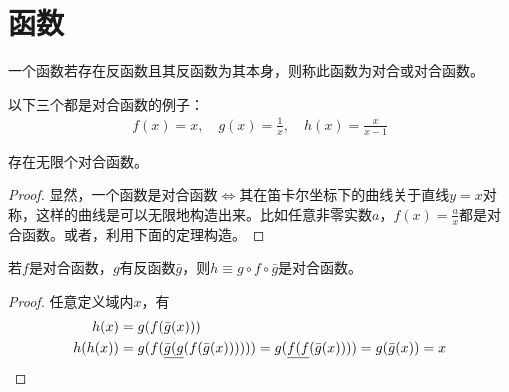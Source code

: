 
\section{函数}
\label{sec:function}

\begin{definition}[对合，Involution]
  一个函数若存在反函数且其反函数为其本身，则称此函数为对合或对合函数。
\end{definition}

\begin{example}
  以下三个都是对合函数的例子：
  \begin{align*}
    f(x)=x,\quad g(x)=\frac1x,\quad h(x)=\frac{x}{x-1}
  \end{align*}
\end{example}

\begin{example}
  存在无限个对合函数。
\end{example}
\begin{proof}
  显然，一个函数是对合函数$\iff$其在笛卡尔坐标下的曲线关于直线$y=x$对称，这样的曲线是可以无限地构造出来。比如任意非零实数$a$，$f(x)=\frac{a}{x}$都是对合函数。或者，利用下面的定理构造。
\end{proof}

\begin{theorem}
  若$f$是对合函数，$g$有反函数$\bar g$，则$h\equiv g\circ f\circ\bar g$是对合函数。
\end{theorem}
\begin{proof}
  任意定义域内$x$，有
  \begin{align*}
    h(x)&= g(f(\bar g(x)))\\
    h(h(x))&=g(f(\underline{\bar g( g}(f(\bar g(x))) ))) = g(\underline{f(f}(\bar g(x)))) = g(\bar g(x)) = x \qedhere
  \end{align*}
\end{proof}
